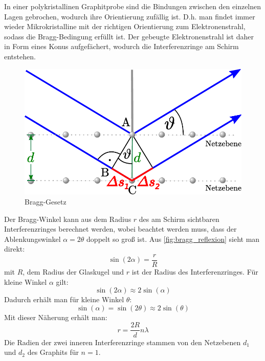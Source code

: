 \documentclass[ngerman]{scrartcl}
\begin{document}
In einer polykristallinen Graphitprobe sind die Bindungen zwischen den einzelnen Lagen gebrochen, wodurch ihre Orientierung zufällig ist. D.h. man findet immer wieder
Mikrokristalline mit der richtigen Orientierung zum Elektronenstrahl, sodass die Bragg-Bedingung erfüllt ist. Der gebeugte Elektronenstrahl ist daher in Form eines Konus aufgefächert, wodurch die Interferenzringe am Schirm entstehen.
%
\begin{figure}[H]
    \centering
    \begin{samepage}
        \includegraphics[width=0.5\linewidth]{fig/bragg-reflexion.pdf}
        \caption{Bragg-Gesetz}
        \label{fig:bragg_reflexion}
    \end{samepage}
\end{figure}
%
Der Bragg-Winkel kann aus dem Radius $r$ des am Schirm sichtbaren Interferenzringes berechnet werden, wobei beachtet werden muss, dass der Ablenkungswinkel $\alpha = 2\theta$ doppelt so groß ist. Aus \autoref{fig:bragg_reflexion} sieht man direkt:
%
\begin{equation}
    \label{eq:ablenkwinkel_radius}
    \sin(2\alpha) = \frac{r}{R}
\end{equation}
%
mit $R$, dem Radius der Glaskugel und $r$ ist der Radius des Interferenzringes. Für kleine Winkel $\alpha$ gilt:
%
\[\sin(2\alpha) \approx 2\sin(\alpha)\]
%
Dadurch erhält man für kleine Winkel $\theta$:
%
\[\sin(\alpha)=\sin(2\theta)\approx2\sin(\theta)\]
%
Mit dieser Näherung erhält man:
%
\begin{equation}
    \label{eq:radius_wellenlaenge}
    r=\frac{2R}{d}n\lambda
\end{equation}
%
Die Radien der zwei inneren Interferenzringe stammen von den Netzebenen $d_1$ und $d_2$ des Graphits für $n=1$.
\end{document}
